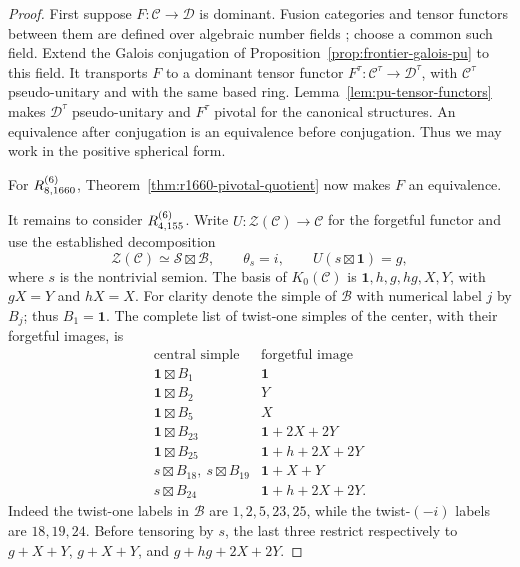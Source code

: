 \begin{proof}
First suppose $F\colon\mathcal C\to\mathcal D$ is dominant.
Fusion categories and tensor functors between them are defined over
algebraic number fields \cite[Corollary~9.1.8]{EGNO}; choose a common
such field. Extend the Galois conjugation of
Proposition~\ref{prop:frontier-galois-pu} to this field. It transports
$F$ to a dominant tensor functor $F^\tau\colon\mathcal C^\tau\to
\mathcal D^\tau$, with $\mathcal C^\tau$ pseudo-unitary and with the
same based ring. Lemma~\ref{lem:pu-tensor-functors} makes
$\mathcal D^\tau$ pseudo-unitary and $F^\tau$ pivotal for the canonical
structures. An equivalence after conjugation is an equivalence before
conjugation. Thus we may work in the positive spherical form.

For $R^{(6)}_{8,1660}$, Theorem~\ref{thm:r1660-pivotal-quotient} now makes
$F$ an equivalence.

It remains to consider $R^{(6)}_{4,155}$. Write
$U:\mathcal Z(\mathcal C)\to\mathcal C$ for the forgetful functor and
use the established decomposition
\[
 \mathcal Z(\mathcal C)\simeq\mathcal S\boxtimes\mathcal B,
 \qquad \theta_s=i,\qquad U(s\boxtimes\mathbf1)=g,
\]
where $s$ is the nontrivial semion. The basis of $K_0(\mathcal C)$ is
$\mathbf1,h,g,hg,X,Y$, with $gX=Y$ and $hX=X$.
For clarity denote the simple of $\mathcal B$ with numerical label $j$
by $B_j$; thus $B_1=\mathbf1$.
The complete list of twist-one simples of the center, with their
forgetful images, is
\begin{equation}\label{eq:r155-twist-one-restrictions}
\begin{array}{c|l}
\text{central simple}&\text{forgetful image}\\ \hline
 \mathbf1\boxtimes B_1&\mathbf1\\
 \mathbf1\boxtimes B_2&Y\\
 \mathbf1\boxtimes B_5&X\\
 \mathbf1\boxtimes B_{23}&\mathbf1+2X+2Y\\
 \mathbf1\boxtimes B_{25}&\mathbf1+h+2X+2Y\\
 s\boxtimes B_{18},\ s\boxtimes B_{19}&\mathbf1+X+Y\\
 s\boxtimes B_{24}&\mathbf1+h+2X+2Y.
\end{array}
\end{equation}
Indeed the twist-one labels in $\mathcal B$ are $1,2,5,23,25$, while
the twist-$(-i)$ labels are $18,19,24$. Before tensoring by $s$, the
last three restrict respectively to $g+X+Y$, $g+X+Y$, and
$g+hg+2X+2Y$.


\end{proof}
